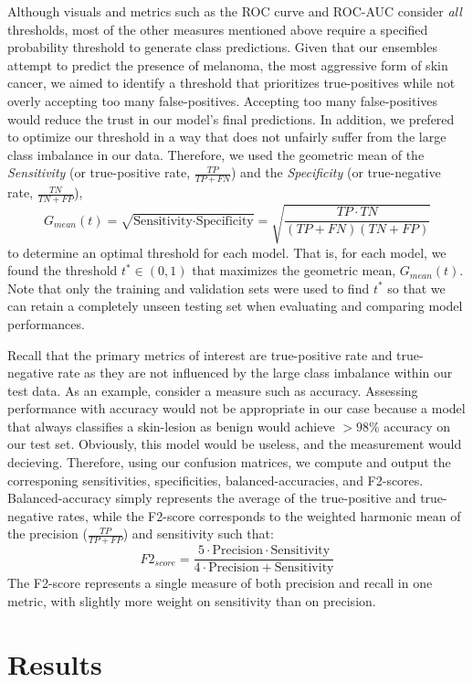 \documentclass [MAS] {uclathes}
\begin{document}
Although visuals and metrics such as the ROC curve and ROC-AUC consider \textit{all} thresholds, most of the other measures mentioned above require a specified probability threshold to generate class predictions. Given that our ensembles attempt to predict the presence of melanoma, the most aggressive form of skin cancer, we aimed to identify a threshold that prioritizes true-positives while not overly accepting too many false-positives. Accepting too many false-positives would reduce the trust in our model's final predictions. In addition, we prefered to optimize our threshold in a way that does not unfairly suffer from the large class imbalance in our data. Therefore, we used the geometric mean of the \textit{Sensitivity} (or true-positive rate, $\frac{TP}{TP+FN}$) and the \textit{Specificity} (or true-negative rate, $\frac{TN}{TN+FP}$), $$G_{mean}(t) = \sqrt{\text{Sensitivity} \cdot \text{Specificity}} = \sqrt{\frac{TP \cdot TN }{(TP + FN)(TN + FP)}}$$ to determine an optimal threshold for each model. That is, for each model, we found the threshold $t^* \in (0, 1)$ that maximizes the geometric mean, $G_{mean}(t)$. Note that only the training and validation sets were used to find $t^*$ so that we can retain a completely unseen testing set when evaluating and comparing model performances.

Recall that the primary metrics of interest are true-positive rate and true-negative rate as they are not influenced by the large class imbalance within our test data. As an example, consider a measure such as accuracy. Assessing performance with accuracy would not be appropriate in our case because a model that always classifies a skin-lesion as benign would achieve $>98$\% accuracy on our test set. Obviously, this model would be useless, and the measurement would decieving. Therefore, using our confusion matrices, we compute and output the corresponing sensitivities, specificities, balanced-accuracies, and F2-scores. Balanced-accuracy simply represents the average of the true-positive and true-negative rates, while the F2-score corresponds to the weighted harmonic mean of the precision ($\frac{TP}{TP + FP}$) and sensitivity such that: $$F2_{score} = \frac{5 \cdot \text{Precision} \cdot \text{Sensitivity}}{4 \cdot \text{Precision} +\text{Sensitivity}}$$ The F2-score represents a single measure of both precision and recall in one metric, with slightly more weight on sensitivity than on precision.

\chapter{Results}
\end{document}
